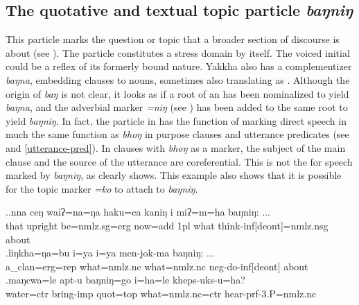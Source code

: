 \subsection{The quotative and textual topic particle \emph{baŋniŋ}}
	
This particle marks the question or topic that a broader section of discourse is about (see \Next). The particle constitutes a stress domain by itself. The voiced initial could be a reflex of its formerly bound nature. Yakkha also has a complementizer \emph{baŋna}, embedding clauses to nouns, sometimes also translating as . Although the origin of \emph{baŋ} is not clear, it looks as if a root of an  has been  nominalized to yield \emph{baŋna}, and the  adverbial  marker  \emph{=niŋ} (see ) has been added to the same root to yield \emph{baŋniŋ}. In fact, the particle in \Next[c] has the function of marking direct speech in much the same function as \emph{bhoŋ} in purpose clauses and utterance predicates (see  and \ref{utterance-pred}). In clauses with  \emph{bhoŋ} as a  marker, the subject of the main clause and the source of the utterance are coreferential. This is not the  for speech marked by  \emph{baŋniŋ}, as \Next[c] clearly shows. This example also shows that it is possible for the topic marker \emph{=ko} to attach to  \emph{baŋniŋ}.
\largerpage[-1]

\ex.\ag.nna  ceŋ    waiʔ=na=ŋa      haku=ca   kaniŋ i  miʔ=m=ha baŋniŋ: ...\\
that upright be{\sc [3sg]=nmlz.sg=erg} now{\sc =add} {\sc 1pl} what think{\sc -inf[deont]=nmlz.nsg} about\\
 
\bg.\label{ex-bu}liŋkha=ŋa=bu         i=ya                i=ya                men-jok-ma              baŋniŋ: ...\\
a\_clan{\sc =erg=rep}  what{\sc =nmlz.nc} what{\sc =nmlz.nc} {\sc neg-}do{\sc -inf[deont]} about\\
 
\bg.maŋcwa=le          apt-u     baŋniŋ=go   i=ha=le        kheps-uks-u=ha?\\
water{\sc =ctr} bring{\sc -imp} {\sc quot=top} what{\sc =nmlz.nc=ctr} hear{\sc -prf-3.P=nmlz.nc} \\
 



